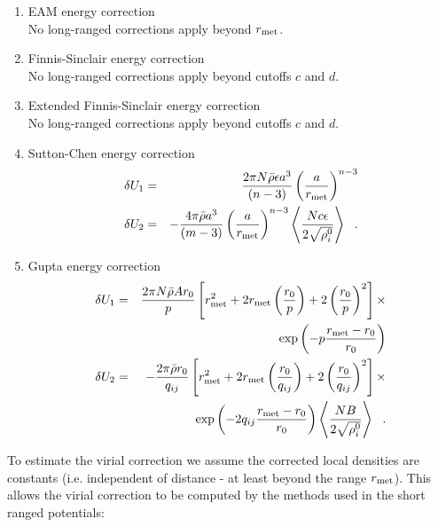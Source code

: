 \begin{enumerate}
\item EAM energy correction \\
No long-ranged corrections apply beyond $r_{\rm met}$.
\item Finnis-Sinclair energy correction \\
No long-ranged corrections apply beyond cutoffs $c$ and $d$.
\item Extended Finnis-Sinclair energy correction \\
No long-ranged corrections apply beyond cutoffs $c$ and $d$.
\item Sutton-Chen energy correction
\begin{eqnarray}
\delta U_{1} &=& \frac{2 \pi N \bar{\rho} \epsilon a^{3}}{(n-3)}
\left( \frac{a}{r_{\rm met}} \right)^{n-3} \nonumber \\
\delta U_{2} &=& -\frac{4 \pi \bar{\rho} a^{3}}{(m-3)} \left( \frac{a}{r_{\rm met}} \right)^{n-3}
\left< \frac{N c \epsilon}{2\sqrt{\rho_{i}^{0}}} \right>~~.
\end{eqnarray}
\item Gupta energy correction
\begin{eqnarray}
\delta U_{1} &=& \frac{2 \pi N \bar{\rho} A r_{0}}{p}
\left[ r_{\rm met}^{2} + 2 r_{\rm met} \left(\frac{r_{0}}{p}\right) +
2 \left(\frac{r_{0}}{p}\right)^{2} \right] \times \nonumber \\
& & \exp \left( -p \frac{r_{\rm met}-r_{0}}{r_{0}}\right) \nonumber \\
\delta U_{2} &=& -\frac{2 \pi \bar{\rho} r_{0}}{q_{ij}}
\left[ r_{\rm met}^{2} + 2 r_{\rm met} \left(\frac{r_{0}}{q_{ij}}\right) +
2 \left(\frac{r_{0}}{q_{ij}}\right)^{2} \right] \times \\
& & \exp \left( -2 q_{ij} \frac{r_{\rm met}-r_{0}}{r_{0}}\right)
\left< \frac{N B}{2\sqrt{\rho_{i}^{0}}} \right>~~. \nonumber
\end{eqnarray}
\end{enumerate}
To estimate the virial correction we assume the corrected local
densities are constants (i.e. independent of distance - at least
beyond the range $r_{\rm met}$).  This allows the virial correction to
be computed by the methods used in the short ranged potentials:
